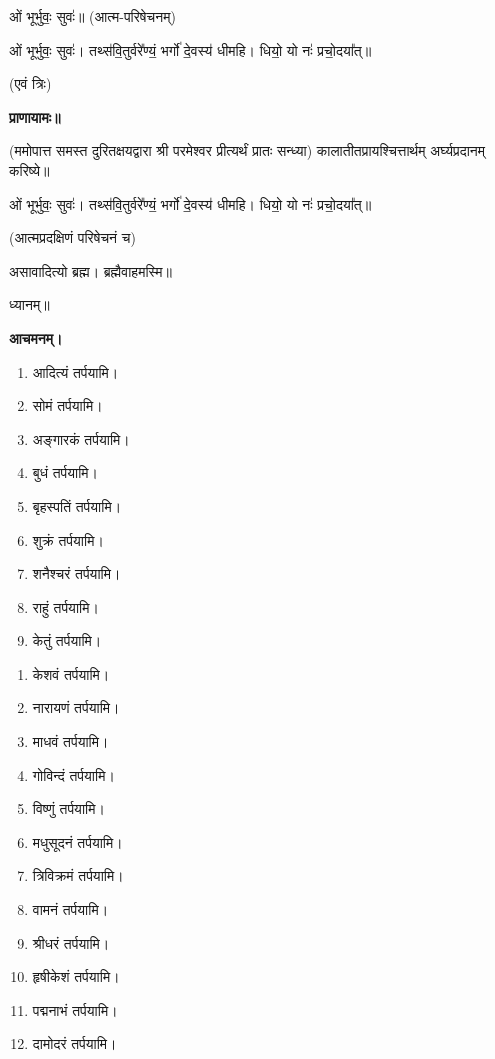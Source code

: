 ओं भूर्भुवः॒ सुवः॑॥ (आत्म-परिषेचनम्)



ओं भूर्भुवः॒ सुवः॑। तथ्स॑वि॒तुर्वरे᳚ण्यं॒ भर्गो॑ दे॒वस्य॑ धीमहि। धियो॒ यो नः॑ प्रचो॒दया᳚त्॥

\hfill{(एवं त्रिः)}


\textbf{प्राणायामः॥}

(ममोपात्त समस्त दुरितक्षयद्वारा श्री परमेश्वर प्रीत्यर्थं प्रातः सन्ध्या)
कालातीतप्रायश्चित्तार्थम् अर्घ्यप्रदानम् करिष्ये॥

ओं भूर्भुवः॒ सुवः॑। तथ्स॑वि॒तुर्वरे᳚ण्यं॒ भर्गो॑ दे॒वस्य॑ धीमहि। धियो॒ यो नः॑ प्रचो॒दया᳚त्॥

(आत्मप्रदक्षिणं परिषेचनं च)


असावादित्यो ब्रह्म। ब्रह्मैवाहमस्मि॥

ध्यानम्॥

\textbf{आचमनम्।}



\begin{enumerate}
 \item आदित्यं तर्पयामि।
 \item सोमं तर्पयामि।
 \item अङ्गारकं तर्पयामि।
 \item बुधं तर्पयामि।
 \item बृहस्पतिं तर्पयामि।
 \item शुक्रं तर्पयामि।
 \item शनैश्चरं तर्पयामि।
 \item राहुं तर्पयामि।
 \item केतुं तर्पयामि।
\end{enumerate}


\begin{enumerate}
\item केशवं तर्पयामि।
\item नारायणं तर्पयामि।
\item माधवं तर्पयामि।
\item गोविन्दं तर्पयामि।
\item विष्णुं तर्पयामि।
\item मधुसूदनं तर्पयामि।
\item त्रिविक्रमं तर्पयामि।
\item वामनं तर्पयामि।
\item श्रीधरं तर्पयामि।
\item हृषीकेशं तर्पयामि।
\item पद्मनाभं तर्पयामि।
\item दामोदरं तर्पयामि।
\end{enumerate}

